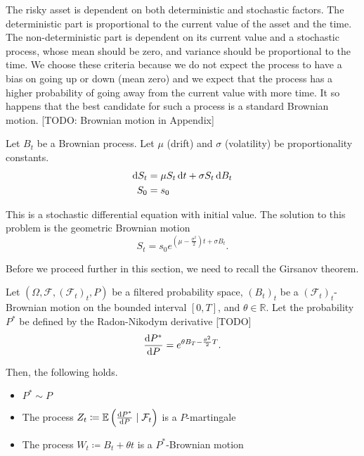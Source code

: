 The risky asset is dependent on both deterministic and stochastic factors. The deterministic part is proportional to the current value of the asset and the time. The non-deterministic part is dependent on its current value and a stochastic process, whose mean should be zero, and variance should be proportional to the time. We choose these criteria because we do not expect the process to have a bias on going up or down (mean zero) and we expect that the process has a higher probability of going away from the current value with more time. It so happens that the best candidate for such a process is a standard Brownian motion.
[TODO: Brownian motion in Appendix]

Let $ B_t $ be a Brownian process. Let $ \mu $ (drift) and $ \sigma $ (volatility) be proportionality constants.
\begin{subequations}
	\label{eq:continous-risky-sde}
	\begin{align}
		\dif S_t  &=  \mu S_t \dif t + \sigma S_t \dif B_t \\
		S_0  &=  s_0
	\end{align}
\end{subequations}

This is a stochastic differential equation with initial value. The solution to this problem is the geometric Brownian motion
\begin{equation}
\label{eq:continous-risky-int}
S_t = s_0 e^{ ( \mu - \frac{\sigma^2}{2} )t + \sigma B_t }.
\end{equation}


Before we proceed further in this section, we need to recall the Girsanov theorem.
\begin{thm}[Girsanov]
	\label{thm:continuous-girsanov}
	Let $ (\Omega, \mathcal{F}, (\mathcal{F}_t)_t, P) $ be a filtered probability space, $ (B_t)_t $ be a $ (\mathcal{F}_t)_t $-Brownian motion on the bounded interval $ [0, T] $, and $ \theta \in \mathbb{R} $. Let the probability $ P^* $ be defined by the Radon-Nikodym derivative [TODO]
	\begin{equation}
	\frac{\dif P^*}{\dif P} = e^{ \theta B_T - \frac{\theta^2}{2} T }.
	\end{equation}
	
	Then, the following holds.
	\begin{itemize}
		\item $ P^* \sim P $
		\item The process $ Z_t \coloneqq \E \left( \frac{\dif P^*}{\dif P} \mid \mathcal{F}_t \right) $ is a $ P $-martingale
		\item The process $ W_t \coloneqq B_t + \theta t $ is a $ P^* $-Brownian motion
	\end{itemize}
\end{thm}

